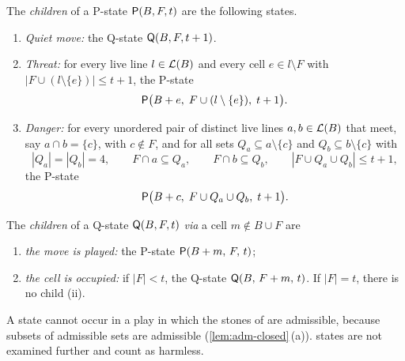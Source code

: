 \begin{definition}
The \emph{children} of a P-state $\mathsf{P}(B,F,t)$ are the following states.
\begin{enumerate}[leftmargin=2.6em]
\item[\textup{(a)}] \emph{Quiet move:} the Q-state $\mathsf{Q}(B,F,t+1)$.
\item[\textup{(c)}] \emph{Threat:} for every live line $l\in\mathcal{L}(B)$ and every cell $e\in l\setminus F$ with
  $|F\cup(l\setminus\{e\})|\le t+1$, the P-state
  \[ \mathsf{P}\bigl(B+e,\;F\cup(l\setminus\{e\}),\;t+1\bigr). \]
\item[\textup{(d)}] \emph{Danger:} for every unordered pair of distinct live lines $a,b\in\mathcal{L}(B)$ that meet,
  say $a\cap b=\{c\}$, with $c\notin F$, and for all sets $Q_a\subseteq a\setminus\{c\}$ and
  $Q_b\subseteq b\setminus\{c\}$ with
  \[ |Q_a|=|Q_b|=4,\qquad F\cap a\subseteq Q_a,\qquad F\cap b\subseteq Q_b,\qquad |F\cup Q_a\cup Q_b|\le t+1, \]
  the P-state
  \[ \mathsf{P}\bigl(B+c,\;F\cup Q_a\cup Q_b,\;t+1\bigr). \]
\end{enumerate}
The \emph{children} of a Q-state $\mathsf{Q}(B,F,t)$ \emph{via} a cell $m\notin B\cup F$ are
\begin{enumerate}[leftmargin=2.6em]
\item[\textup{(i)}] \emph{the move is played:} the P-state $\mathsf{P}(B+m,\,F,\,t)$;
\item[\textup{(ii)}] \emph{the cell is occupied:} if $|F|<t$, the Q-state $\mathsf{Q}(B,\,F+m,\,t)$. If $|F|=t$,
  there is no child \textup{(ii)}.
\end{enumerate}
\end{definition}

A \VOID{} state cannot occur in a play in which the stones of \Maker{} are admissible, because subsets of
admissible sets are admissible (\cref{lem:adm-closed}\,(a)). \VOID{} states are not examined further and
count as harmless.

